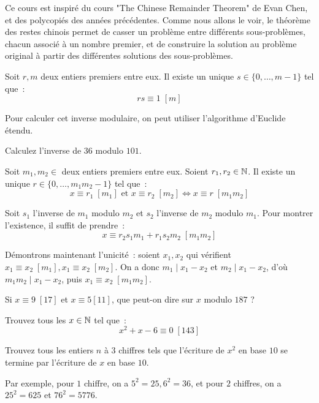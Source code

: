 Ce cours est inspiré du cours "The Chinese Remainder Theorem" de Evan Chen, et des polycopiés des années précédentes.
Comme nous allons le voir, le théorème des restes chinois permet de casser un problème entre différents sous-problèmes, chacun associé à un nombre premier, et de construire la solution au problème original à partir des différentes solutions des sous-problèmes.

\begin{thm}
	Soit $r, m$ deux entiers premiers entre eux.
	Il existe un unique $s \in \{0, \dots, m - 1\}$ tel que~:
	$$rs \equiv 1 \; [m]$$
\end{thm}

Pour calculer cet inverse modulaire, on peut utiliser l'algorithme d'Euclide étendu.

\begin{exo}
	Calculez l'inverse de $36$ modulo $101$.
\end{exo}

\begin{thm}
	Soit $m_1, m_2 \in $ deux entiers premiers entre eux.
	Soient $r_1, r_2 \in \mathbb N$. Il existe un unique $r \in \{0, \dots, m_1m_2 - 1\}$ tel que~:
	$$x \equiv r_1 \; [m_1] \mbox{ et } x \equiv r_2 \; [m_2] \iff x \equiv r \; [m_1 m_2]$$
\end{thm}
\begin{preuve}
	Soit $s_1$ l'inverse de $m_1$ modulo $m_2$ et $s_2$ l'inverse de $m_2$ modulo $m_1$.
	Pour montrer l'existence, il suffit de prendre~:
	$$x \equiv r_2 s_1 m_1 + r_1 s_2 m_2 \; [m_1m_2]$$
	
	Démontrons maintenant l'unicité~:
	soient $x_1, x_2$ qui vérifient $x_1 \equiv x_2 \; [m_1], x_1 \equiv x_2 \; [m_2]$.
	On a donc $m_1 \;|\; x_1 - x_2$ et $m_2 \;|\; x_1 - x_2$, d'où $m_1m_2 \;|\; x_1 - x_2$, puis $x_1 \equiv x_2 \; [m_1m_2]$.
\end{preuve}

\begin{exo}
	Si $x \equiv 9 \; [17]$ et $x \equiv 5 [11]$, que peut-on dire sur $x$ modulo $187$ ?
\end{exo}

\begin{exo}
	Trouvez tous les $x \in \mathbb N$ tel que~:
	$$x^2 + x - 6 \equiv 0 \; [143]$$
\end{exo}

\begin{exo}
	Trouvez tous les entiers $n$ à $3$ chiffres tels que l'écriture de $x^2$ en base $10$ se termine par l'écriture de $x$ en base $10$.
	
	Par exemple, pour $1$ chiffre, on a $5^2 = 25, 6^2 = 36$, et pour $2$ chiffres, on a $25^2 = 625$ et $76^2 = 5776$.
\end{exo}

